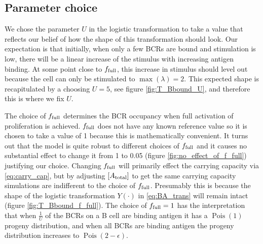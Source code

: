 \subsection{Parameter choice}
We chose the parameter $U$ in the logistic transformation to take a value that reflects our belief of how the shape of this transformation should look.
Our expectation is that initially, when only a few BCRs are bound and stimulation is low, there will be a linear increase of the stimulus with increasing antigen binding.
At some point close to $f_{\text{full}}$, this increase in stimulus should level out because the cell can only be stimulated to $\operatorname{max}(\lambda)=2$.
This expected shape is recapitulated by a choosing $U=5$, see figure \ref{fig:T_Bbound_U}, and therefore this is where we fix $U$.

The choice of $f_{\text{full}}$ determines the BCR occupancy when full activation of proliferation is achieved.
$f_{\text{full}}$ does not have any known reference value so it is chosen to take a value of 1 because this is mathematically convenient.
It turns out that the model is quite robust to different choices of $f_{\text{full}}$ and it causes no substantial effect to change it from 1 to 0.05 (figure \ref{fig:no_effect_of_f_full}) justifying our choice.
Changing $f_{\text{full}}$ will primarily effect the carrying capacity via \eqref{eq:carry_cap}, but by adjusting $[A_{\text{total}}]$ to get the same carrying capacity simulations are indifferent to the choice of $f_{\text{full}}$.
Presumably this is because the shape of the logistic transformation $Y(\cdot)$ in \eqref{eq:BA_trans} will remain intact (figure \ref{fig:T_Bbound_f_full}).
The choice of $f_{\text{full}} = 1$ has the interpretation that when $\frac{1}{U}$ of the BCRs on a B cell are binding antigen it has a $\operatorname{Pois}(1)$ progeny distribution, and when all BCRs are binding antigen the progeny distribution increases to $\operatorname{Pois}(2-\epsilon)$.

